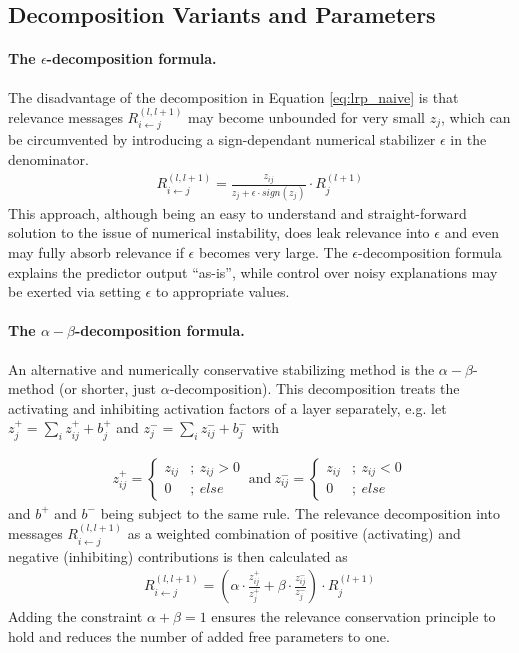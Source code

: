 \documentclass[a4wide]{article}
\begin{document}
\subsection*{Decomposition Variants and Parameters}
\paragraph{The $\epsilon$-decomposition formula.}
The disadvantage of the decomposition in Equation \ref{eq:lrp_naive} is that relevance messages $R^{(l,l+1)}_{i\leftarrow j}$ may become unbounded for very small $z_j$, which can be circumvented by introducing a sign-dependant numerical stabilizer $\epsilon$ in the denominator.
\begin{align}
R^{(l,l+1)}_{i\leftarrow j} = \frac{z_{ij}}{z_j + \epsilon \cdot sign(z_j)}\cdot R_j^{(l+1)}
\label{eq:lrp_epsilon}
\end{align}
This approach, although being an easy to understand and straight-forward solution to the issue of numerical instability, does leak relevance into $\epsilon$ and even may fully absorb relevance if $\epsilon$ becomes very large.
The $\epsilon$-decomposition formula explains the predictor output ``as-is'', while control over noisy explanations may be exerted via setting $\epsilon$ to appropriate values.

\paragraph{The $\alpha-\beta$-decomposition formula.}
An alternative and numerically conservative stabilizing method is the $\alpha-\beta$-method (or shorter, just $\alpha$-decomposition).
This decomposition treats the activating and inhibiting activation factors of a layer separately, e.g. let $z_j^+ = \sum_i z^+_{ij} + b^+_j$ and $z_j^- = \sum_i z^-_{ij} + b^-_j$ with

\begin{align}
z^+_{ij} = \begin{cases} z_{ij} &;~ z_{ij} > 0 \\ 0  &;~ else \end{cases}
~\text{and}~
z^-_{ij} = \begin{cases} z_{ij} &;~ z_{ij} < 0 \\ 0  &;~ else \end{cases}
\end{align}
and $b^+$ and $b^-$ being subject to the same rule.
The relevance decomposition into messages $R_{i \leftarrow j}^{(l,l+1)}$ as a weighted combination of positive (activating) and negative (inhibiting) contributions is then calculated as
\begin{align}
R^{(l,l+1)}_{i\leftarrow j} = \left(\alpha\cdot\frac{z_{ij}^+}{z_j^+} + \beta\cdot\frac{z_{ij}^-}{z_j^-}\right)\cdot R_j^{(l+1)}
\label{eq:lrp_alphabeta}
\end{align}
Adding the constraint $\alpha + \beta = 1$ ensures the relevance conservation principle to hold and reduces the number of added free parameters to one.
\end{document}
